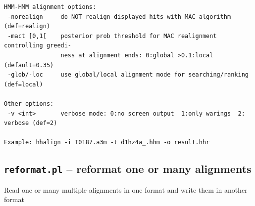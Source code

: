 \documentclass[11pt,a4paper]{article}
\begin{document}
\begin{verbatim}
HMM-HMM alignment options:                                                       
 -norealign     do NOT realign displayed hits with MAC algorithm (def=realign)   
 -mact [0,1[    posterior prob threshold for MAC realignment controlling greedi- 
                ness at alignment ends: 0:global >0.1:local (default=0.35)       
 -glob/-loc     use global/local alignment mode for searching/ranking (def=local)

Other options:                                                                   
 -v <int>       verbose mode: 0:no screen output  1:only warings  2: verbose (def=2)

Example: hhalign -i T0187.a3m -t d1hz4a_.hhm -o result.hhr
\end{verbatim} 
\normalsize


\subsection{{\tt reformat.pl} -- reformat one or many alignments}

Read one or many multiple alignments in one format and write them in another format
\end{document}
